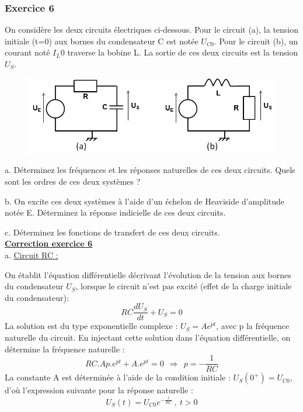 \documentclass[11pt]{report}
\begin{document}
 	 
 	\vspace{1\baselineskip}
 	
 	\subsubsection{Exercice 6}
 	
 	On considère les deux circuits électriques ci-dessous. Pour le circuit (a), la tension initiale (t=0) aux bornes du condensateur C est notée $U_{C0}$. Pour le circuit (b), un courant noté $I_L0$ traverse la bobine L. La sortie de ces deux circuits est la tension $U_{S}$.
 	
 	\begin{figure}[h!]
 		\centering
 		\includegraphics[scale=0.5]{images/Exo_2_4.jpg} 
 	\end{figure} 
 	
 	a. Déterminez les fréquences et les réponses naturelles de ces deux circuits. Quels sont les ordres de ces deux systèmes ? 
 	
 	b. On excite ces deux systèmes à l'aide d'un échelon de Heaviside d'amplitude notée E. Déterminez la réponse indicielle de ces deux circuits. 
 	
 	c. Déterminez les fonctions de transfert de ces deux circuits.\\
 	
 	\textbf{\underline{Correction exercice 6}}\\
 	
 	a. \underline{Circuit RC :}
 	
 	On établit l'équation différentielle décrivant l'évolution de la tension aux bornes du condensateur $U_S$, lorsque le circuit n'est pas excité (effet de la charge initiale du condensateur):
 	\begin{equation*}
 	RC\frac{dU_S}{dt}+U_S=0
 	\end{equation*}
 	La solution est du type exponentielle complexe : $U_S=Ae^{pt}$, avec p la fréquence naturelle du circuit. En injectant cette solution dans l'équation différentielle, on détermine la fréquence naturelle :
 	\begin{equation*}
 	RC.Ap.e^{pt}+A.e^{pt}=0~~\Rightarrow~~p = -\frac{1}{RC}
 	\end{equation*}
 	La constante A est déterminée à l'aide de la condition initiale : $U_S(0^+)=U_{C0}$, d'où l'expression suivante pour la réponse naturelle :
 	\begin{equation*}
 	U_S(t)=U_{C0}e^{-\frac{t}{RC}}~,~t>0
 	\end{equation*}
 	
\end{document}
